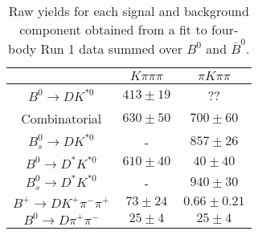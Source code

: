 \begin{table}
  \centering
  \begin{tabular}{ccc}
      \toprule
       & $K\pi\pi\pi$ & $\pi K\pi\pi$ \\
      \midrule
      $B^0 \to DK^{*0}$ & $413 \pm 19$ & ?? \\
      Combinatorial & $630 \pm 50$ & $700 \pm 60$ \\
      $B^0_s \to DK^{*0}$ & \-- & $857 \pm 26$ \\
      $B^0 \to D^*K^{*0}$ & $610 \pm 40$ & $40 \pm 40$ \\
      $B^0_s \to D^*K^{*0}$ & \-- & $940 \pm 30$ \\
      $B^+ \to DK^+\pi^-\pi^+$ & $73 \pm 24$ & $0.66 \pm 0.21$ \\
      $B^0 \to D\pi^+\pi^-$ & $25 \pm 4$ & $25 \pm 4$ \\
      \bottomrule
      \end{tabular}
  \caption{Raw yields for each signal and background component obtained from a fit to four-body Run 1 data summed over $B^0$ and $\bar{B}^0$.}
\label{tab:yields_combined_4body_run1}
\end{table}
